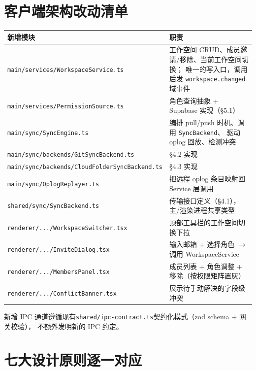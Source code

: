 \documentclass[12pt, a4paper]{article}
\begin{document}
\section{客户端架构改动清单}

\begin{longtable}{p{4.4cm} p{8.1cm}}
  \toprule
  \textbf{新增模块} & \textbf{职责} \\
  \midrule
  \texttt{main/services/WorkspaceService.ts} & 工作空间 CRUD、成员邀请/移除、当前工作空间切换；
    唯一的写入口，调用后发 \texttt{workspace.changed} 域事件 \\
  \texttt{main/services/PermissionSource.ts} & 角色查询抽象 + Supabase 实现（\S5.1） \\
  \texttt{main/sync/SyncEngine.ts} & 编排 pull/push 时机、调用 \texttt{SyncBackend}、
    驱动 oplog 回放、检测冲突 \\
  \texttt{main/sync/backends/GitSyncBackend.ts} & \S4.2 实现 \\
  \texttt{main/sync/backends/CloudFolderSyncBackend.ts} & \S4.3 实现 \\
  \texttt{main/sync/OplogReplayer.ts} & 把远程 oplog 条目映射回 Service 层调用 \\
  \texttt{shared/sync/SyncBackend.ts} & 传输接口定义（\S4.1），主/渲染进程共享类型 \\
  \texttt{renderer/.../WorkspaceSwitcher.tsx} & 顶部工具栏的工作空间切换下拉 \\
  \texttt{renderer/.../InviteDialog.tsx} & 输入邮箱 + 选择角色 $\to$ 调用 WorkspaceService \\
  \texttt{renderer/.../MembersPanel.tsx} & 成员列表 + 角色调整 + 移除（按权限矩阵置灰） \\
  \texttt{renderer/.../ConflictBanner.tsx} & 展示待手动解决的字段级冲突 \\
  \bottomrule
\end{longtable}

新增 IPC 通道遵循现有\texttt{shared/ipc-contract.ts}契约化模式（zod schema + 网关校验），
不额外发明新的 IPC 约定。

\section{七大设计原则逐一对应}
\end{document}
